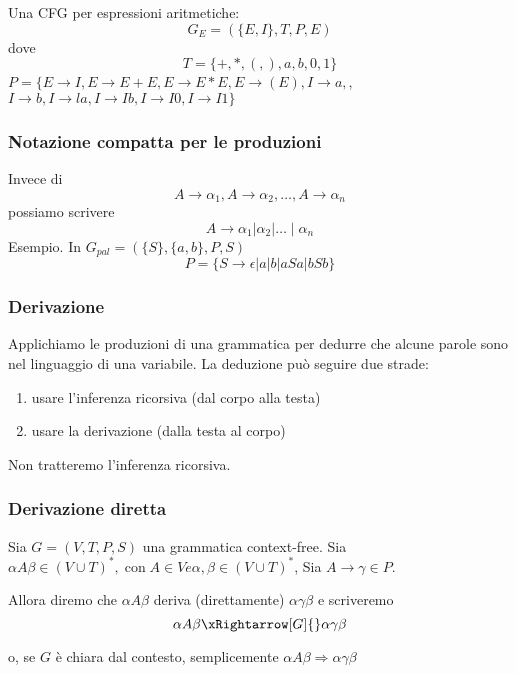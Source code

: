 Una CFG per espressioni aritmetiche:
$$
G_{E}=(\{E, I\}, T, P, E)
$$
dove
$$
T=\{+, *,(,), a, b, 0,1\}
$$
 $P=\{E \rightarrow I, E \rightarrow E+E, E \rightarrow E * E, E \rightarrow(E), I \rightarrow a,$, $I \rightarrow b, I \rightarrow l a, I \rightarrow I b, I \rightarrow I 0, I \rightarrow I 1\}$
 
\subsubsection{Notazione compatta per le produzioni}
Invece di
$$
A \rightarrow \alpha_{1}, A \rightarrow \alpha_{2}, \ldots, A \rightarrow \alpha_{n}
$$
possiamo scrivere
$$
A \rightarrow \alpha_{1}\left|\alpha_{2}\right| \ldots \mid \alpha_{n}
$$
Esempio. In $G_{p a l}=(\{S\},\{a, b\}, P, S)$
$$
P=\{S \rightarrow \epsilon|a| b|a S a| b S b\}
$$

\subsubsection{Derivazione}
Applichiamo le produzioni di una grammatica per dedurre che alcune parole sono nel linguaggio di una variabile.
La deduzione può seguire due strade:
\begin{enumerate}
    \item usare l'inferenza ricorsiva (dal corpo alla testa)
    \item usare la derivazione (dalla testa al corpo)
\end{enumerate}
Non tratteremo l'inferenza ricorsiva.

\subsubsection{Derivazione diretta}
Sia $G=(V, T, P, S)$ una grammatica context-free.
Sia $\alpha A \beta \in(V \cup T)^{*}, \operatorname{con} A \in V e \alpha, \beta \in(V \cup T)^{*}$,
Sia $A \rightarrow \gamma \in P$.


Allora diremo che
$\alpha A \beta$ deriva (direttamente)  $\alpha \gamma \beta$
e scriveremo
$$\alpha A \beta \xRightarrow[G]{} \alpha \gamma \beta$$  

o, se $G$ è chiara dal contesto, semplicemente
$\alpha A \beta \Rightarrow \alpha \gamma \beta$

\vspace{5mm}

